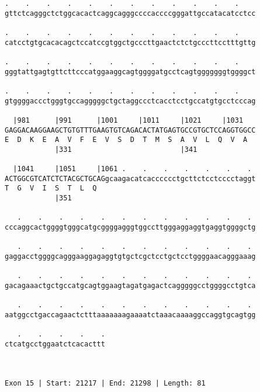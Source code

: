 \documentclass{article}
\begin{document}
\begin{Verbatim}
.    .    .    .    .    .    .    .    .    .    .    .    
gttctcagggctctggcacactcaggcagggccccaccccgggattgccatacatcctcc
                                                            
.    .    .    .    .    .    .    .    .    .    .    .    
catcctgtgcacacagctccatccgtggctgcccttgaactctctgcccttcctttgttg
                                                            
.    .    .    .    .    .    .    .    .    .    .    .    
gggtattgagtgttcttcccatggaaggcagtggggatgcctcagtgggggggtggggct
                                                            
.    .    .    .    .    .    .    .    .    .    .    .    
gtggggaccctgggtgccagggggctgctaggccctcacctcctgccatgtgcctcccag
                                                            
  |981      |991      |1001     |1011     |1021     |1031   
GAGGACAAGGAAGCTGTGTTTGAAGTGTCAGACACTATGAGTGCCGTGCTCCAGGTGGCC
E  D  K  E  A  V  F  E  V  S  D  T  M  S  A  V  L  Q  V  A  
            |331                          |341              
  
  |1041     |1051     |1061 .    .    .    .    .    .    . 
ACTGGCGTCATCTCTACGCTGCAGgcaagacatcacccccctgcttctcctcccctaggt
T  G  V  I  S  T  L  Q                                      
            |351                                            
  
   .    .    .    .    .    .    .    .    .    .    .    . 
cccaggcactggggtgggcatgcggggagggtggccttgggaggaggtgaggtggggctg
                                                            
   .    .    .    .    .    .    .    .    .    .    .    . 
gaggacctggggcagggaaggagaggtgtgctcgctcctgctcctggggaacagggaaag
                                                            
   .    .    .    .    .    .    .    .    .    .    .    . 
gacagaaactgctgccatgcagtggaagtagatgagactcagggggcctggggcctgtca
                                                            
   .    .    .    .    .    .    .    .    .    .    .    . 
aatggcctgaccagaactctttaaaaaaagaaaatctaaacaaaaggccaggtgcagtgg
                                                            
   .    .    .    .    .
ctcatgcctggaatctcacacttt
                        
                        
 
Exon 15 | Start: 21217 | End: 21298 | Length: 81




\end{Verbatim}
\end{document}
